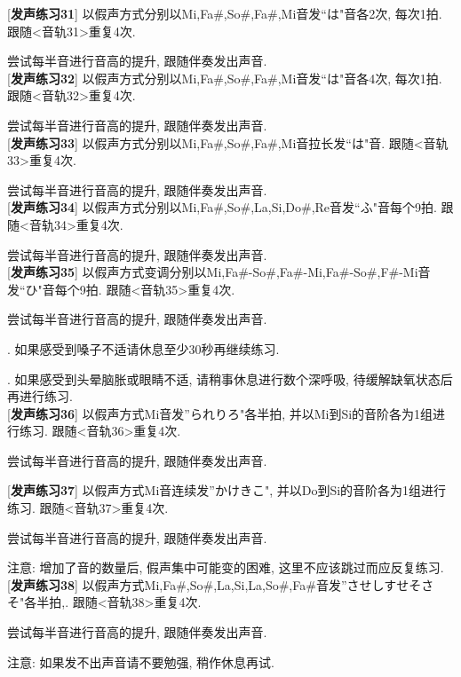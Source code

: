 [\textbf{发声练习31}] 以假声方式分别以Mi,Fa\#,So\#,Fa\#,Mi音发``は"音各2次, 每次1拍. 跟随<音轨31>重复4次.\par
\qquad 尝试每半音进行音高的提升, 跟随伴奏发出声音.\\

[\textbf{发声练习32}] 以假声方式分别以Mi,Fa\#,So\#,Fa\#,Mi音发``は"音各4次, 每次1拍. 跟随<音轨32>重复4次.\par
\qquad 尝试每半音进行音高的提升, 跟随伴奏发出声音.\\

[\textbf{发声练习33}] 以假声方式分别以Mi,Fa\#,So\#,Fa\#,Mi音拉长发``は"音. 跟随<音轨33>重复4次.\par
\qquad 尝试每半音进行音高的提升, 跟随伴奏发出声音.\\

[\textbf{发声练习34}] 以假声方式分别以Mi,Fa\#,So\#,La,Si,Do\#,Re音发``ふ"音每个9拍. 跟随<音轨34>重复4次.\par
\qquad 尝试每半音进行音高的提升, 跟随伴奏发出声音.\\

[\textbf{发声练习35}] 以假声方式变调分别以Mi,Fa\#-So\#,Fa\#-Mi,Fa\#-So\#,F\#-Mi音发``ひ"音每个9拍. 跟随<音轨35>重复4次.\par
\qquad 尝试每半音进行音高的提升, 跟随伴奏发出声音.\par
{}. 如果感受到嗓子不适请休息至少30秒再继续练习.\par
{}. 如果感受到头晕脑胀或眼睛不适, 请稍事休息进行数个深呼吸, 待缓解缺氧状态后再进行练习.\\

[\textbf{发声练习36}] 以假声方式Mi音发''られりろ"各半拍, 并以Mi到Si的音阶各为1组进行练习. 跟随<音轨36>重复4次.\par
\qquad 尝试每半音进行音高的提升, 跟随伴奏发出声音.\\

\clearpage

[\textbf{发声练习37}] 以假声方式Mi音连续发''かけきこ", 并以Do到Si的音阶各为1组进行练习. 跟随<音轨37>重复4次.\par
\qquad 尝试每半音进行音高的提升, 跟随伴奏发出声音.\par
\qquad 注意: 增加了音的数量后, 假声集中可能变的困难, 这里不应该跳过而应反复练习.\\

[\textbf{发声练习38}] 以假声方式Mi,Fa\#,So\#,La,Si,La,So\#,Fa\#音发''させしすせそさそ"各半拍,. 跟随<音轨38>重复4次.\par
\qquad 尝试每半音进行音高的提升, 跟随伴奏发出声音.\par
\qquad 注意: 如果发不出声音请不要勉强, 稍作休息再试.\\

